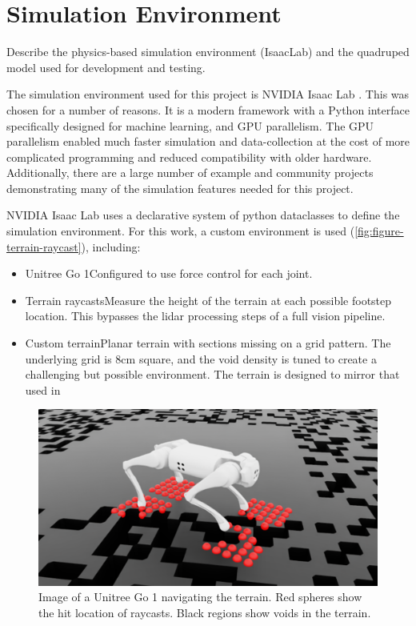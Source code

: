 \section{Simulation Environment}

\begin{outline}
  Describe the physics-based simulation environment (IsaacLab) and
  the quadruped model used for development and testing.
\end{outline}

The simulation environment used for this project is NVIDIA Isaac Lab
\cite{mittal_orbit_2023}. This was chosen for a number of reasons. It
is a modern framework with a Python interface specifically designed
for machine learning, and GPU parallelism. The GPU parallelism
enabled much faster simulation and data-collection at the cost of
more complicated programming and reduced compatibility with older
hardware. Additionally, there are a large number of example and
community projects demonstrating many of the simulation features
needed for this project.

NVIDIA Isaac Lab uses a declarative system of python dataclasses to
define the simulation environment. For this work, a custom
environment is used (\autoref{fig:figure-terrain-raycast}), including:

\begin{itemize}
  \item Unitree Go 1\textemdash Configured to use force control for each joint.
  \item Terrain raycasts\textemdash Measure the height of the terrain
    at each possible footstep location. This bypasses the lidar
    processing steps of a full vision pipeline.
  \item Custom terrain\textemdash Planar terrain with sections
    missing on a grid pattern. The underlying grid is 8cm square, and
    the void density is tuned to create a challenging but possible
    environment. The terrain is designed to mirror that used in
    \cite{bratta_contactnet_2024}
\end{itemize}

\begin{figure}
  \centering
  \includegraphics[width=0.75\linewidth]{images/figures/terrain-raycast.png}
  \caption{Image of a Unitree Go 1 navigating the terrain. Red
    spheres show the hit location of raycasts. Black regions show voids
  in the terrain.}
  \label{fig:figure-terrain-raycast}
\end{figure}

